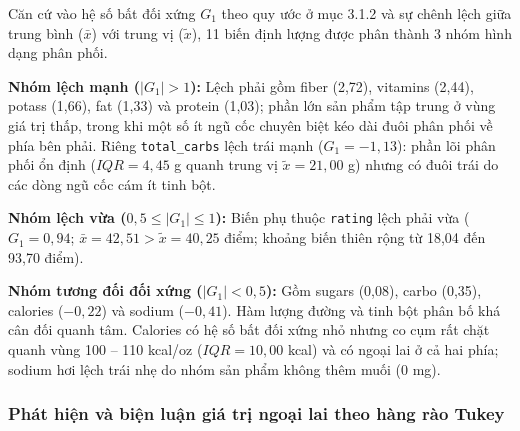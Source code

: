 \documentclass[12pt,a4paper]{article}
\newcommand{\xbar}{\bar{x}}
\newcommand{\xmed}{\tilde{x}}
\begin{document}
Căn cứ vào hệ số bất đối xứng $G_1$ theo quy ước ở mục 3.1.2 và sự chênh lệch giữa trung bình
($\xbar$) với trung vị ($\xmed$), 11 biến định lượng được phân thành 3 nhóm hình dạng phân phối.

\textbf{Nhóm lệch mạnh ($|G_1| > 1$):} Lệch phải gồm fiber (2,72), vitamins (2,44),
potass (1,66), fat (1,33) và protein (1,03); phần lớn sản phẩm tập trung ở vùng giá trị thấp,
trong khi một số ít ngũ cốc chuyên biệt kéo dài đuôi phân phối về phía bên phải. Riêng
\texttt{total\_carbs} lệch trái mạnh ($G_1 = -1{,}13$): phần lõi phân phối ổn định
($IQR = 4{,}45$ g quanh trung vị $\xmed = 21{,}00$ g) nhưng có đuôi trái do các dòng ngũ cốc
cám ít tinh bột.

\textbf{Nhóm lệch vừa ($0{,}5 \le |G_1| \le 1$):} Biến phụ thuộc \texttt{rating} lệch
phải vừa ($G_1 = 0{,}94$; $\xbar = 42{,}51 > \xmed = 40{,}25$ điểm; khoảng biến thiên rộng từ
18,04 đến 93,70 điểm).

\textbf{Nhóm tương đối đối xứng ($|G_1| < 0{,}5$):} Gồm sugars (0,08), carbo (0,35),
calories ($-0{,}22$) và sodium ($-0{,}41$). Hàm lượng đường và tinh bột phân bố khá cân đối
quanh tâm. Calories có hệ số bất đối xứng nhỏ nhưng co cụm rất chặt quanh vùng
100 -- 110 kcal/oz ($IQR = 10{,}00$ kcal) và có ngoại lai ở cả hai phía; sodium hơi lệch trái
nhẹ do nhóm sản phẩm không thêm muối (0 mg).

\subsubsection{Phát hiện và biện luận giá trị ngoại lai theo hàng rào Tukey}
\end{document}
